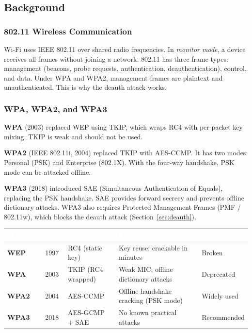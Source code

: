 \documentclass[12pt,a4paper]{article}
\begin{document}
\subsection{Background}

\subsubsection{802.11 Wireless Communication}

Wi-Fi uses IEEE 802.11 over shared radio frequencies. In \emph{monitor mode}, a device receives all frames without joining a network. 802.11 has three frame types: management (beacons, probe requests, authentication, deauthentication), control, and data. Under WPA and WPA2, management frames are plaintext and unauthenticated. This is why the deauth attack works.

\subsubsection{WPA, WPA2, and WPA3}

\textbf{WPA} (2003) replaced WEP using TKIP, which wraps RC4 with per-packet key mixing. TKIP is weak and should not be used.

\textbf{WPA2} (IEEE 802.11i, 2004) replaced TKIP with AES-CCMP. It has two modes: Personal (PSK) and Enterprise (802.1X). With the four-way handshake, PSK mode can be attacked offline.

\textbf{WPA3} (2018) introduced SAE (Simultaneous Authentication of Equals), replacing the PSK handshake. SAE provides forward secrecy and prevents offline dictionary attacks. WPA3 also requires Protected Management Frames (PMF / 802.11w), which blocks the deauth attack (Section~\ref{sec:deauth}).

\vspace{4pt}
\begin{tabularx}{\textwidth}{>{\bfseries\footnotesize}l >{\centering\arraybackslash\footnotesize}p{1cm} >{\footnotesize}l >{\footnotesize}X >{\footnotesize}l}
\arrayrulecolor{accent!40}
\toprule
\rowcolor{tableheadbg}
\textcolor{white}{\textbf{Standard}} &
\textcolor{white}{\textbf{Year}} &
\textcolor{white}{\textbf{Cipher}} &
\textcolor{white}{\textbf{Key Vulnerability}} &
\textcolor{white}{\textbf{Status}} \\
\midrule
WEP  & 1997 & RC4 (static key)   & Key reuse; crackable in minutes       & Broken \\
\rowcolor{tablerowalt}
WPA  & 2003 & TKIP (RC4 wrapped) & Weak MIC; offline dictionary attacks  & Deprecated \\
WPA2 & 2004 & AES-CCMP           & Offline handshake cracking (PSK mode) & Widely used \\
\rowcolor{tablerowalt}
WPA3 & 2018 & AES-GCMP + SAE     & No known practical attacks            & Recommended \\
\bottomrule
\end{tabularx}
\vspace{4pt}
\end{document}
